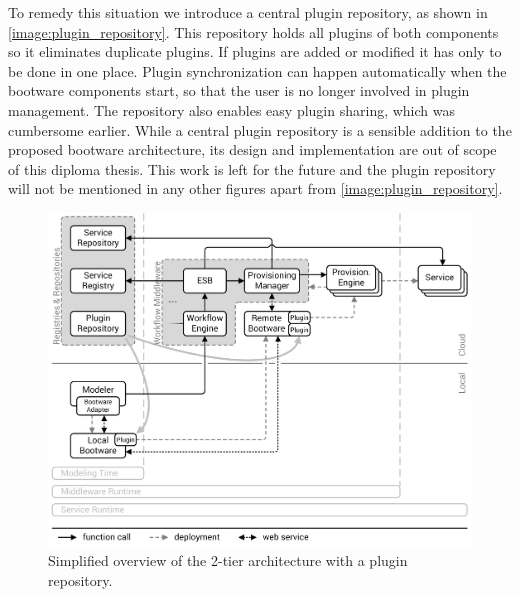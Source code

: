 To remedy this situation we introduce a central plugin repository, as shown in \autoref{image:plugin_repository}.
This repository holds all plugins of both components so it eliminates duplicate plugins.
If plugins are added or modified it has only to be done in one place.
Plugin synchronization can happen automatically when the bootware components start, so that the user is no longer involved in plugin management.
The repository also enables easy plugin sharing, which was cumbersome earlier.
While a central plugin repository is a sensible addition to the proposed bootware architecture, its design and implementation are out of scope of this diploma thesis.
This work is left for the future and the plugin repository will not be mentioned in any other figures apart from \autoref{image:plugin_repository}.

\begin{figure}[!htbp]
	\centering
	\includegraphics[resolution=600]{design/assets/plugin_repository}
	\caption{Simplified overview of the 2-tier architecture with a plugin repository.}
	\label{image:plugin_repository}
\end{figure}
